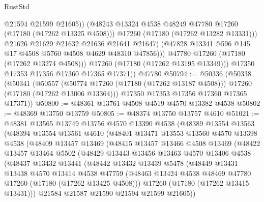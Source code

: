 \begin{lexlean}{RustStd}
\begin{coremodule}
{\begin{coremodule}
{{{{{{{{{{{{{{{{{{{{{{{{{{{{{{{{{{{{{{{{{{{{{{{{{{{{{{{                        @21594
                        @21599
                        @21605))
                    (@48243 @13324 @4538 @48249 @47780 @17260 (@17180 (@17262 @13325 @4508)))
                    @17260
                    (@17180 (@17262 @13282 @13331)))
                  @21626
                  @21629
                  @21632
                  @21636
                  @21641
                  @21647)
                (@47828 @13341 @596 @145 @17 @4508 @5760 @4508 @4629 @48310 @47856)))
            @47780
            @17260
            (@17180 (@17262 @13274 @4508)))
          @17260
          (@17180 (@17262 @13195 @13349)))
        @17350
        @17353
        @17356
        @17360
        @17365
        @17371))
    @47780
@50794 := @50336
    (@50338
      (@50341
        (@50557
          (@50774 @17260 (@17180 (@17262 @13187 @4508)))
          @17260
          (@17180 (@17262 @13006 @13364)))
        @17350
        @17353
        @17356
        @17360
        @17365
        @17371))
@50800 := @48361 @13761 @4508 @4519 @4570 @13382 @4538
@50802 := @48369 @13750 @13759
@50805 := @48374 @13750 @13757 @4610
@51021 := @48381
    @13565
    @13749
    @13756
    @4570
    @13390
    @4538
    (@48389
      @13554
      @13563
      (@48394
        @13554
        @13561
        @4610
        (@48401
          @13471
          @13553
          @13560
          @4570
          @13398
          @4538
          (@48409
            @13457
            @13469
            (@48415
              @13457
              @13466
              @4508
              @13469
              (@48422
                @13457
                @13464
                @5502
                (@48429
                  @13443
                  @13456
                  @13463
                  @4570
                  @13406
                  @4538
                  (@48437
                    @13432
                    @13441
                    (@48442
                      @13432
                      @13439
                      @5478
                      (@48449
                        @13431
                        @13438
                        @4570
                        @13414
                        @4538
                        @47759
                        (@48463 @13424 @4538 @48469 @47780 @17260 (@17180 (@17262 @13425 @4508)))
                        @17260
                        (@17180 (@17262 @13415 @13431)))
                      @21584
                      @21587
                      @21590
                      @21594
                      @21599
                      @21605))
}}}}}}}}}}}}}}}}}}}}}}}}}}}}}}}}}}}}}}}}}}}}}}}}}}}}}}}
\end{coremodule}}
\end{coremodule}
\end{lexlean}
